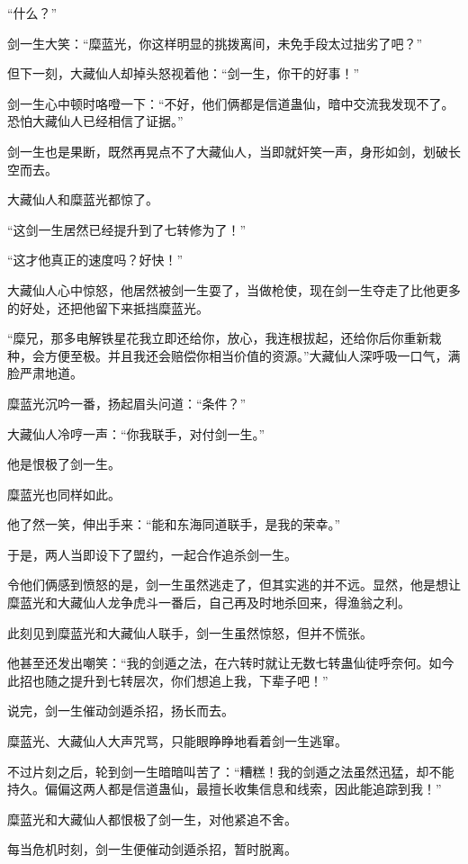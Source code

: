 \begin{this_body}
“什么？”

剑一生大笑：“糜蓝光，你这样明显的挑拨离间，未免手段太过拙劣了吧？”

但下一刻，大藏仙人却掉头怒视着他：“剑一生，你干的好事！”

剑一生心中顿时咯噔一下：“不好，他们俩都是信道蛊仙，暗中交流我发现不了。恐怕大藏仙人已经相信了证据。”

剑一生也是果断，既然再晃点不了大藏仙人，当即就奸笑一声，身形如剑，划破长空而去。

大藏仙人和糜蓝光都惊了。

“这剑一生居然已经提升到了七转修为了！”

“这才他真正的速度吗？好快！”

大藏仙人心中惊怒，他居然被剑一生耍了，当做枪使，现在剑一生夺走了比他更多的好处，还把他留下来抵挡糜蓝光。

“糜兄，那多电解铁星花我立即还给你，放心，我连根拔起，还给你后你重新栽种，会方便至极。并且我还会赔偿你相当价值的资源。”大藏仙人深呼吸一口气，满脸严肃地道。

糜蓝光沉吟一番，扬起眉头问道：“条件？”

大藏仙人冷哼一声：“你我联手，对付剑一生。”

他是恨极了剑一生。

糜蓝光也同样如此。

他了然一笑，伸出手来：“能和东海同道联手，是我的荣幸。”

于是，两人当即设下了盟约，一起合作追杀剑一生。

令他们俩感到愤怒的是，剑一生虽然逃走了，但其实逃的并不远。显然，他是想让糜蓝光和大藏仙人龙争虎斗一番后，自己再及时地杀回来，得渔翁之利。

此刻见到糜蓝光和大藏仙人联手，剑一生虽然惊怒，但并不慌张。

他甚至还发出嘲笑：“我的剑遁之法，在六转时就让无数七转蛊仙徒呼奈何。如今此招也随之提升到七转层次，你们想追上我，下辈子吧！”

说完，剑一生催动剑遁杀招，扬长而去。

糜蓝光、大藏仙人大声咒骂，只能眼睁睁地看着剑一生逃窜。

不过片刻之后，轮到剑一生暗暗叫苦了：“糟糕！我的剑遁之法虽然迅猛，却不能持久。偏偏这两人都是信道蛊仙，最擅长收集信息和线索，因此能追踪到我！”

糜蓝光和大藏仙人都恨极了剑一生，对他紧追不舍。

每当危机时刻，剑一生便催动剑遁杀招，暂时脱离。


\end{this_body}
